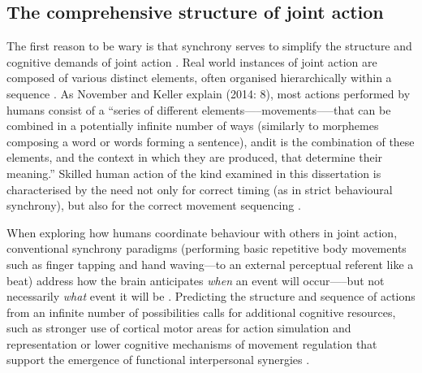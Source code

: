 \begin{CJK}{UTF8}{gbsn}
\subsection{The comprehensive structure of joint action \label{sect:structureJA}}
The first reason to be wary is that synchrony serves to simplify the structure and cognitive demands of joint action \citep{Novembre2014}.  Real world instances of joint action are composed of various distinct elements, often organised hierarchically within a sequence \citep{Schmidt1975,Rosenbaum2009}.  As November and Keller explain (2014: 8), most actions performed by humans consist of a ``series of different elements—--movements--—that can be combined in a potentially infinite number of ways (similarly to morphemes composing a word or words forming a sentence), and\textellipsis it is the combination of these elements, and the context in which they are produced, that determine their meaning.''  Skilled human action of the kind examined in this dissertation is characterised by the need not only for correct timing (as in strict behavioural synchrony), but also for the correct movement sequencing \citep{Palmer2003}.

When exploring how humans coordinate behaviour with others in joint action, conventional synchrony paradigms (performing basic repetitive body movements such as finger tapping and hand waving---to an external perceptual referent like a beat) address how the brain anticipates \textit{when} an event will occur—--but not necessarily \textit{what} event it will be \citep{Novembre2014}.  Predicting the structure and sequence of actions from an infinite number of possibilities calls for additional cognitive resources, such as stronger use of cortical motor areas for action simulation and representation \citep{Bekkering2009} or lower cognitive mechanisms of movement regulation that support the emergence of functional interpersonal synergies \citep{Riley2011}.


\end{CJK}
